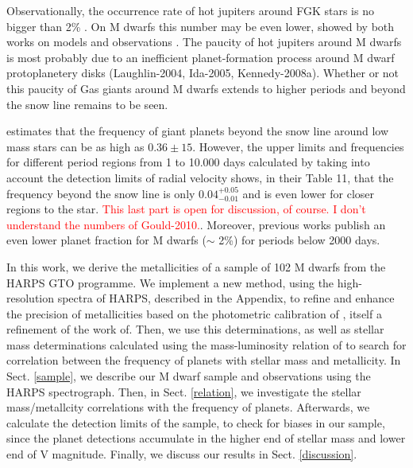 \documentclass[structabstract]{aa}
\begin{document}
Observationally, the occurrence rate of hot jupiters around FGK stars is no bigger than 2\% \citep[e.g.][]{Howard-2010,Mayor-2011}. On M dwarfs this number may be even lower, showed by both works on models \citep[e.g.][]{Laughlin-2004,Ida-2005, Kennedy-2008a} and observations \citep[e.g.][]{Endl-2006, Cumming-2008,Johnson-2010,Bonfils-2011}. The paucity of hot jupiters around M dwarfs is most probably due to an inefficient planet-formation process around M dwarf protoplanetery disks (Laughlin-2004, Ida-2005, Kennedy-2008a). Whether or not this paucity of Gas giants around M dwarfs extends to higher periods and beyond the snow line remains to be seen. 

\citet{Gould-2010} estimates that the frequency of giant planets beyond the snow line around low mass stars can be as high as $0.36\pm15$. However, the upper limits and frequencies for different period regions from 1 to 10.000 days calculated by \citet{Bonfils-2011} taking into account the detection limits of radial velocity shows, in their Table 11, that the frequency beyond the snow line is only $0.04^{+0.05}_{-0.01}$ and is even lower for closer regions to the star. \textcolor{red}{This last part is open for discussion, of course. I don't understand the numbers of Gould-2010.}. Moreover, previous works \citep{Butler-2006,Cumming-2008} publish an even lower planet fraction for M dwarfs ($\sim$ 2\%) for periods below 2000 days. 



In this work, we derive the metallicities of a sample of 102 M dwarfs from the HARPS GTO programme. We implement a new method, using the high-resolution spectra of HARPS, described in the Appendix, to refine and enhance the precision of metallicities based on the photometric calibration of \citet{Neves-2012}, itself a refinement of the work of\citet{Schlaufman-2010}. Then, we use this determinations, as well as stellar mass determinations calculated using the mass-luminosity relation of \citet{Delfosse-2000} to search for correlation between the frequency of planets with stellar mass and metallicity. In Sect. \ref{sample}, we describe our M dwarf sample and observations using the HARPS spectrograph. Then, in Sect. \ref{relation}, we investigate the stellar mass/metallcity correlations with the frequency of planets. Afterwards, we calculate the detection limits of the sample, to check for biases in our sample, since the planet detections accumulate in the higher end of stellar mass and lower end of V magnitude. Finally, we discuss our results in Sect. \ref{discussion}.
\end{document}
